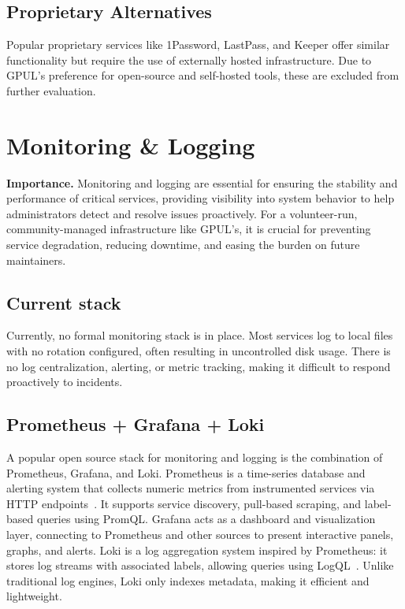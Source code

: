 \subsection*{Proprietary Alternatives}
Popular proprietary services like 1Password, LastPass, and Keeper offer similar functionality but require the use of externally hosted infrastructure. Due to GPUL's preference for open-source and self-hosted tools, these are excluded from further evaluation.

\section{Monitoring \& Logging}

\textbf{Importance.} Monitoring and logging are essential for ensuring the stability and performance of critical services, providing visibility into system behavior to help administrators detect and resolve issues proactively. For a volunteer-run, community-managed infrastructure like GPUL's, it is crucial for preventing service degradation, reducing downtime, and easing the burden on future maintainers.

\subsection*{Current stack}
Currently, no formal monitoring stack is in place. Most services log to local files with no rotation configured, often resulting in uncontrolled disk usage. There is no log centralization, alerting, or metric tracking, making it difficult to respond proactively to incidents.

\subsection*{Prometheus + Grafana + Loki}
A popular open source stack for monitoring and logging is the combination of Prometheus, Grafana, and Loki. Prometheus is a time-series database and alerting system that collects numeric metrics from instrumented services via HTTP endpoints~\cite{prometheus-docs}. It supports service discovery, pull-based scraping, and label-based queries using PromQL. Grafana acts as a dashboard and visualization layer, connecting to Prometheus and other sources to present interactive panels, graphs, and alerts. Loki is a log aggregation system inspired by Prometheus: it stores log streams with associated labels, allowing queries using LogQL~\cite{loki-docs}. Unlike traditional log engines, Loki only indexes metadata, making it efficient and lightweight.


